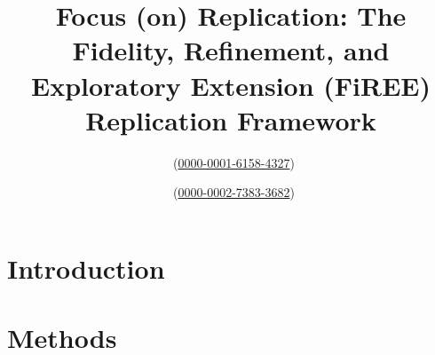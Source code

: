 \documentclass[sn-apa]{sn-jnl}%
\theoremstyle{thmstyleone}%
\theoremstyle{thmstyletwo}%
\theoremstyle{thmstylethree}%
\begin{document}
\title[Article Title]{Focus (on) Replication: The Fidelity, Refinement, and Exploratory Extension (FiREE) Replication Framework}


\author[1]{ ~(\href{https://orcid.org/0000-0001-6158-4327}{0000-0001-6158-4327})}
\author*[1]{ ~(\href{https://orcid.org/0000-0002-7383-3682}{0000-0002-7383-3682})}









\abstract{}








\maketitle
\section{Introduction}\label{sec1}


\section{Methods}\label{sec2}

\end{document}

